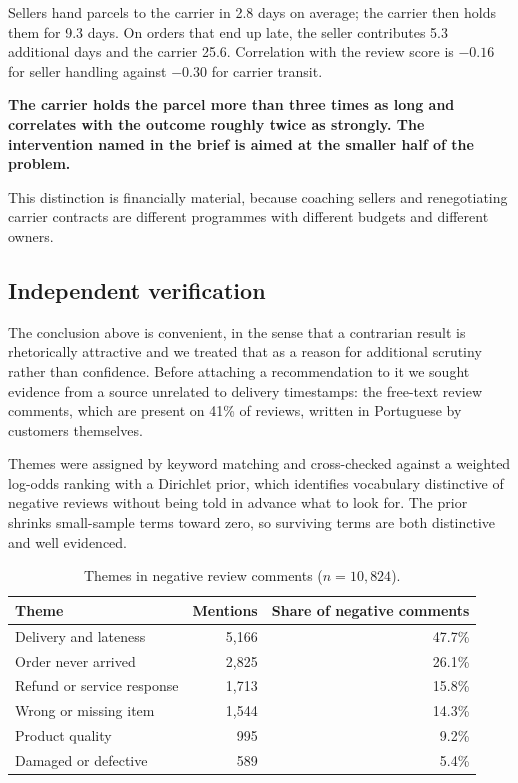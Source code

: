 \documentclass[11pt,a4paper]{article}
\newcommand{\finding}[1]{%
  \par\vspace{0.6em}%
  \noindent\begin{minipage}{\textwidth}%
  \setlength{\fboxsep}{9pt}%
  \noindent\colorbox{wash}{\begin{minipage}{\dimexpr\textwidth-2\fboxsep\relax}%
  \color{ink}\textbf{#1}%
  \end{minipage}}%
  \end{minipage}\par\vspace{0.6em}%
}
\begin{document}
Sellers hand parcels to the carrier in 2.8 days on average; the carrier then holds
them for 9.3 days. On orders that end up late, the seller contributes 5.3 additional
days and the carrier 25.6. Correlation with the review score is $-0.16$ for seller
handling against $-0.30$ for carrier transit.

\finding{The carrier holds the parcel more than three times as long and correlates
with the outcome roughly twice as strongly. The intervention named in the brief is
aimed at the smaller half of the problem.}

This distinction is financially material, because coaching sellers and renegotiating
carrier contracts are different programmes with different budgets and different
owners.

\subsection{Independent verification}

The conclusion above is convenient, in the sense that a contrarian result is
rhetorically attractive and we treated that as a reason for additional scrutiny
rather than confidence. Before attaching a recommendation to it we sought evidence
from a source unrelated to delivery timestamps: the free-text review comments,
which are present on 41\% of reviews, written in Portuguese by customers
themselves.

Themes were assigned by keyword matching and cross-checked against a weighted
log-odds ranking with a Dirichlet prior, which identifies vocabulary distinctive of
negative reviews without being told in advance what to look for. The prior shrinks
small-sample terms toward zero, so surviving terms are both distinctive and well
evidenced.

\begin{table}[H]
\centering
\small
\caption{Themes in negative review comments ($n = 10{,}824$).}
\label{tab:themes}
\begin{tabular}{@{}lrr@{}}
\toprule
\textbf{Theme} & \textbf{Mentions} & \textbf{Share of negative comments}\\
\midrule
Delivery and lateness & 5{,}166 & 47.7\%\\
Order never arrived & 2{,}825 & 26.1\%\\
Refund or service response & 1{,}713 & 15.8\%\\
Wrong or missing item & 1{,}544 & 14.3\%\\
Product quality & 995 & 9.2\%\\
Damaged or defective & 589 & 5.4\%\\
\bottomrule
\end{tabular}
\end{table}
\end{document}
